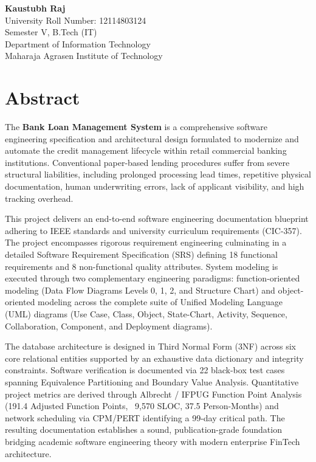 \documentclass[12pt,a4paper,oneside]{report}
\begin{document}
\vspace{2.0cm}

\noindent
\begin{flushright}
    \textbf{Kaustubh Raj}\\
    University Roll Number: 12114803124\\
    Semester V, B.Tech (IT)\\
    Department of Information Technology\\
    Maharaja Agrasen Institute of Technology
\end{flushright}

\newpage
\chapter*{Abstract}

The \textbf{Bank Loan Management System} is a comprehensive software engineering specification and architectural design formulated to modernize and automate the credit management lifecycle within retail commercial banking institutions. Conventional paper-based lending procedures suffer from severe structural liabilities, including prolonged processing lead times, repetitive physical documentation, human underwriting errors, lack of applicant visibility, and high tracking overhead.

This project delivers an end-to-end software engineering documentation blueprint adhering to IEEE standards and university curriculum requirements (CIC-357). The project encompasses rigorous requirement engineering culminating in a detailed Software Requirement Specification (SRS) defining 18 functional requirements and 8 non-functional quality attributes. System modeling is executed through two complementary engineering paradigms: function-oriented modeling (Data Flow Diagrams Levels 0, 1, 2, and Structure Chart) and object-oriented modeling across the complete suite of Unified Modeling Language (UML) diagrams (Use Case, Class, Object, State-Chart, Activity, Sequence, Collaboration, Component, and Deployment diagrams).

The database architecture is designed in Third Normal Form (3NF) across six core relational entities supported by an exhaustive data dictionary and integrity constraints. Software verification is documented via 22 black-box test cases spanning Equivalence Partitioning and Boundary Value Analysis. Quantitative project metrics are derived through Albrecht / IFPUG Function Point Analysis (191.4 Adjusted Function Points, ~9,570 SLOC, 37.5 Person-Months) and network scheduling via CPM/PERT identifying a 99-day critical path. The resulting documentation establishes a sound, publication-grade foundation bridging academic software engineering theory with modern enterprise FinTech architecture.
\end{document}
